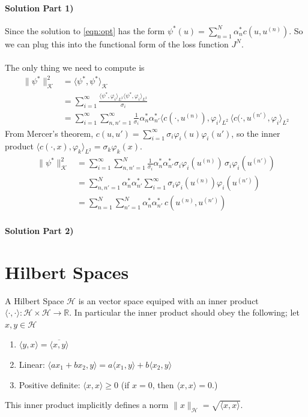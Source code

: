 \documentclass[11pt,fleqn]{article}
\numberwithin{equation}{section}
\theoremstyle{definition}
\theoremstyle{definition}
\begin{document}
\paragraph{Solution Part 1)} 
Since the solution to \ref{eqn:opt} has the form $\psi^*(u) = \sum_{n=1}^N \alpha_n^* c(u, u^{(n)})$. So we can plug this into the functional form of the loss function $J^N$.\\
\\
The only thing we need to compute is
\begin{align}
	\| \psi^*\|_{\mathcal K}^2 & = \langle \psi^*, \psi^* \rangle_{\mathcal K} \\
	& = \sum_{i=1}^\infty \frac{\langle \psi^*, \varphi_i \rangle_{L^2} \langle \psi^*, \varphi_i \rangle_{L^2}}{\sigma_i}\\
	&  = \sum_{i=1}^\infty \sum_{n,n'=1}^\infty  \frac{1}{\sigma_i} \alpha_n^* \alpha_{n'}^* \langle c(\cdot, u^{(n)}), \varphi_i \rangle_{L^2} \, \langle c(\cdot, u^{(n')} , \varphi_i\rangle_{L^2}
\end{align}
From Mercer's theorem, $c(u, u') = \sum_{i=1}^\infty \sigma_i \varphi_i (u) \varphi_i(u')$, so the inner product $\langle c(\cdot, x), \varphi_k\rangle_{L^2} = \sigma_k \varphi_k(x)$.
\begin{align}
	\| \psi^*\|_{\mathcal K}^2 & = \sum_{i=1}^\infty \sum_{n,n'=1}^N  \frac{1}{\sigma_i} \alpha_n^* \alpha_{n'}^* \sigma_i \varphi_i(u^{(n)}) \, \sigma_i \varphi_i(u^{(n')})\\
	& = \sum_{n,n'=1}^N \alpha_n^* \alpha_{n'}^*\sum_{i=1}^\infty \sigma_i \varphi_i(u^{(n)}) \varphi_i(u^{(n')})\\
	& = \sum_{n=1}^N\sum_{n'=1}^N \alpha_n^* \alpha_{n'}^* \, c(u^{(n)}, u^{(n')})
\end{align}

\paragraph{Solution Part 2)} 








\newpage
\appendix
\section*{Hilbert Spaces}
A Hilbert Space $\mathcal H$ is an vector space equiped with an inner product $\langle \cdot, \cdot \rangle : \mathcal H \times \mathcal H \to \mathbb R$. In particular the inner product should obey the following; let $x,y \in \mathcal H$
\begin{enumerate}
	\item $\langle y, x\rangle = \overline{\langle x, y \rangle}$
	\item Linear: $\langle ax_1 + bx_2, y\rangle = a \langle x_1 ,y \rangle + b \langle x_2, y\rangle$
	\item Positive definite: $\langle x, x \rangle \geq 0$ (if $x = 0$, then $\langle x, x \rangle = 0$.)
\end{enumerate} 
This inner product implicitly defines a norm $\|x \|_{\mathcal H} = \sqrt{\langle x, x \rangle}$.
\end{document}
